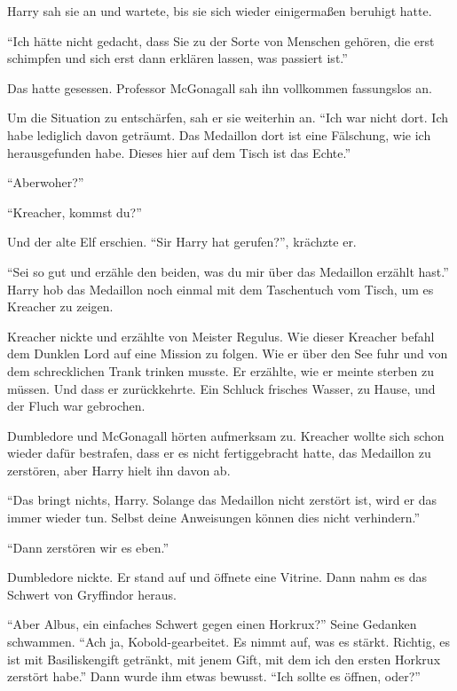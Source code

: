 Harry sah sie an und wartete, bis sie sich wieder einigermaßen beruhigt hatte.

\enquote{Ich hätte nicht gedacht, dass Sie zu der Sorte von Menschen gehören, die erst schimpfen und sich erst dann erklären lassen, was passiert ist.}

Das hatte gesessen. Professor McGonagall sah ihn vollkommen fassungslos an.

Um die Situation zu entschärfen, sah er sie weiterhin an. \enquote{Ich war nicht dort. Ich habe lediglich davon geträumt. Das Medaillon dort ist eine Fälschung, wie ich herausgefunden habe. Dieses hier auf dem Tisch ist das Echte.}

\enquote{Aber\abs woher\abs?}

\enquote{Kreacher, kommst du?}

Und der alte Elf erschien. \enquote{Sir Harry hat gerufen?}, krächzte er.

\enquote{Sei so gut und erzähle den beiden, was du mir über das Medaillon erzählt hast.} Harry hob das Medaillon noch einmal mit dem Taschentuch vom Tisch, um es Kreacher zu zeigen.

Kreacher nickte und erzählte von Meister Regulus. Wie dieser Kreacher befahl dem Dunklen Lord auf eine Mission zu folgen. Wie er über den See fuhr und von dem schrecklichen Trank trinken musste. Er erzählte, wie er meinte sterben zu müssen. Und dass er zurückkehrte. Ein Schluck frisches Wasser, zu Hause, und der Fluch war gebrochen.

Dumbledore und McGonagall hörten aufmerksam zu. Kreacher wollte sich schon wieder dafür bestrafen, dass er es nicht fertiggebracht hatte, das Medaillon zu zerstören, aber Harry hielt ihn davon ab.

\enquote{Das bringt nichts, Harry. Solange das Medaillon nicht zerstört ist, wird er das immer wieder tun. Selbst deine Anweisungen können dies nicht verhindern.}

\enquote{Dann zerstören wir es eben.}

Dumbledore nickte. Er stand auf und öffnete eine Vitrine. Dann nahm es das Schwert von Gryffindor heraus.

\enquote{Aber Albus, ein einfaches Schwert gegen einen Horkrux?} Seine Gedanken schwammen. \enquote{Ach ja, Kobold-gearbeitet. Es nimmt auf, was es stärkt. \gst Richtig, es ist mit Basiliskengift getränkt, mit jenem Gift, mit dem ich den ersten Horkrux zerstört habe.} Dann wurde ihm etwas bewusst. \enquote{Ich sollte es öffnen, oder?}

